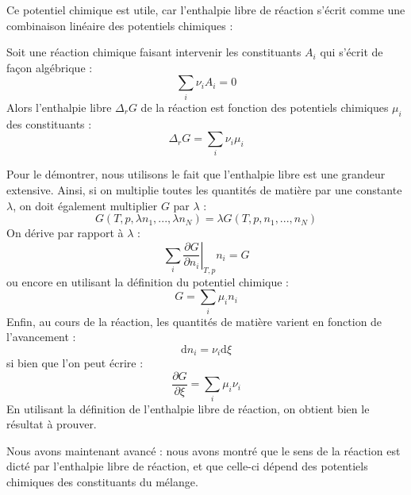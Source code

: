\documentclass[11pt,fleqn]{book} %
\newcommand{\dd}{\mathrm{d}}
\begin{document}
Ce potentiel chimique est utile, car l'enthalpie libre de réaction s'écrit comme une combinaison linéaire des potentiels chimiques :
\begin{theorem}
    Soit une réaction chimique faisant intervenir les constituants $A_i$ qui s'écrit de façon algébrique :
    \begin{equation}
    \sum_i \nu_i A_i = 0
\end{equation}
Alors l'enthalpie libre $\Delta_r G$ de la réaction est fonction des potentiels chimiques $\mu_i$ des constituants :
\begin{equation}
    \Delta_r G = \sum_i \nu_i \mu_i
\end{equation}
\end{theorem}

\begin{demonstration}
    Pour le démontrer, nous utilisons le fait que l'enthalpie libre est une grandeur extensive. Ainsi, si on multiplie toutes les quantités de matière par une constante $\lambda$, on doit également multiplier $G$ par $\lambda$ :
    \begin{equation}
        G(T,p,\lambda n_1,...,\lambda n_N) = \lambda G(T,p,n_1,...,n_N)
    \end{equation}
    On dérive par rapport à $\lambda$ :
    \begin{equation}
        \sum_i \left. \frac{\partial G}{\partial n_i} \right|_{T,p} n_i = G
    \end{equation}
    ou encore en utilisant la définition du potentiel chimique :
    \begin{equation}
        G = \sum_i \mu_i n_i
    \end{equation}
    Enfin, au cours de la réaction, les quantités de matière varient en fonction de l'avancement :
    \begin{equation}
        \dd n_i = \nu_i \dd \xi
    \end{equation}
    si bien que l'on peut écrire :
    \begin{equation}
        \frac{\partial G}{\partial \xi} = \sum_i \mu_i \nu_i
    \end{equation}
    En utilisant la définition de l'enthalpie libre de réaction, on obtient bien le résultat à prouver.
\end{demonstration}

Nous avons maintenant avancé : nous avons montré que le sens de la réaction est dicté par l'enthalpie libre de réaction, et que celle-ci dépend des potentiels chimiques des constituants du mélange.
\end{document}
